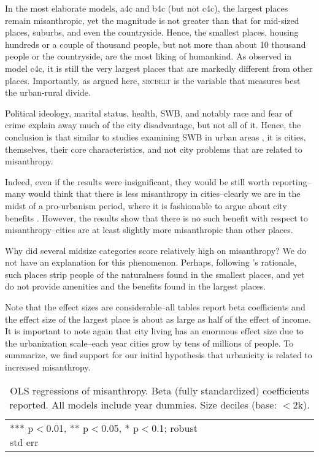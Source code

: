 \documentclass[10pt, letterpaper]{article}
\begin{document}
\begin{spacing}{1.4}
In the most elaborate models, a4c and b4c  (but not c4c), the largest places remain misanthropic, yet the magnitude is not greater than that for mid-sized places, suburbs, and even the countryside. Hence, the smallest places, housing hundreds or a couple of thousand people, but not more than about
10 thousand people or the countryside, are the most liking of humankind. As observed in model c4c, it is still the very largest places that are markedly different from other places. Importantly, as argued here, \textsc{srcbelt} is the variable that measures best the urban-rural divide. 

Political ideology, marital status, health, SWB, and notably race and fear of crime explain away much of the city disadvantage, but not all of it. Hence, the
conclusion is that similar to studies examining SWB in urban areas \citep{aok_brfss_city_cize16}, it is cities, themselves, their core characteristics, and not city problems that are related to misanthropy. 

Indeed, even if the results were insignificant, they would be still worth reporting--many would think that there is less misanthropy in cities--clearly
we are in the midst of a pro-urbanism period, where it is fashionable to argue about city benefits \citep[e.g.,][]{glaeser11}. However, the results show that there is no such benefit with respect to misanthropy--cities are at least slightly more misanthropic than other places.

Why did several midsize categories score relatively high on misanthropy? We do not have an explanation for this phenomenon. Perhaps, following \citet{aok-ls_fisher16}'s rationale, such places strip people of the naturalness found in the smallest places, and yet do not provide amenities and the benefits found in the largest places.

Note that the effect sizes are considerable--all tables report beta coefficients
and the effect size of the largest place is about as large as half of the effect
of income. It is important to note again that city living has an enormous effect size due to the urbanization scale--each year cities
grow by tens of millions of people. To summarize, we find support for our initial hypothesis that urbanicity is related to increased misanthropy. 

\begin{table}[H]\centering
\caption{OLS regressions  of misanthropy. Beta (fully standardized) coefficients
  reported. All models include year dummies. Size deciles (base: $<$2k).} \label{regA}
\begin{scriptsize} \begin{tabular}{p{1.8in}p{.45in}p{.45in}p{.45in}p{.45in}p{.45in}p{.45in}p{.45in}p{.45in}p{.45in}p{.45 in}}\hline

\hline  *** p$<$0.01, ** p$<$0.05, * p$<$0.1; robust std err
\end{tabular}\end{scriptsize}\end{table}


\end{spacing}
\end{document}
